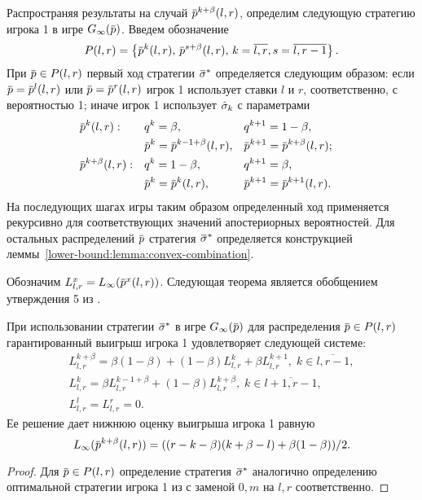{Распространяя результаты \cite{pyanykh16:discr:ru} на случай $\p^{k+\beta}(l, r)$,
определим следующую стратегию игрока 1 в игре $\theGame[\infty](\p)$. Введем
обозначение %
\begin{equation*}
  P(l,r) = \left\{
    \p^k(l, r), \, \p^{s+\beta}(l, r), \, k = \overline{l,r}, s = \overline{l,r-1}
  \right\}.
\end{equation*}
При $\p \in P(l,r)$ первый ход стратегии $\sigmav^*$ определяется следующим
образом: если $\p = \p^l(l,r)$ или $\p = \p^r(l,r)$ игрок 1 использует ставки
$l$ и $r$, соответственно, с вероятностью 1; иначе игрок 1 использует
$\hat{\sigma}_k$ с параметрами
\begin{align*}
  &\p^k(l, r):&
  &q^k = \beta,&
  &q^{k+1} = 1-\beta,\\
  && 
  &\p^k = \p^{k-1+\beta}(l, r),&
  &\p^{k+1} = \p^{k+\beta}(l, r);\\
  &\p^{k+\beta}(l, r):&
  &q^k = 1-\beta,&
  &q^{k+1} = \beta,\\
  &&
  &\p^k = \p^k(l, r),&
  &\p^{k+1} = \p^{k+1}(l, r).&
\end{align*}
На последующих шагах игры таким образом определенный ход применяется рекурсивно
для соответствующих значений апостериорных вероятностей. Для остальных
распределений $\p$ стратегия $\sigmav^*$ определяется конструкцией
леммы~\ref{lower-bound:lemma:convex-combination}.

Обозначим $L^x_{l,r} = \Low(\p^x(l,r))$. Следующая теорема является обобщением
утверждения 5 из \cite{pyanykh16:discr:ru}.
\begin{theorem}
  \label{lower-bound:theorem}
  При использовании стратегии $\sigmav^*$ в игре $\theGame[\infty](\p)$ для
  распределения %
  $\p \in P(l,r)$ %
  гарантированный выигрыш игрока 1 удовлетворяет следующей системе:
  \begin{equation}
    \label{lower-bound:eq:Linf-recurrence}
    \begin{gathered}
      L^{k+\beta}_{l,r} =
      \beta(1-\beta) + (1-\beta) L^k_{l,r} + \beta L^{k+1}_{l,r}, \;
      k \in \overline{l, r - 1}, \\
      L^k_{l,r} =
      \beta L^{k-1+\beta}_{l,r} + (1-\beta) L^{k+\beta}_{l,r}, \;
      k \in \overline{l + 1, r - 1},\\
      L^l_{l,r} = L^r_{l,r} = 0.
    \end{gathered}
  \end{equation}
  Ее решение дает нижнюю оценку выигрыша игрока 1 равную
  \begin{equation*}
    \label{lower-bound:eq:Linf-recurrence-solution}
    \Low(\p^{k+\beta}(l, r)) = ((r-k-\beta)(k+\beta-l) + \beta(1-\beta))/2.
  \end{equation*}
\end{theorem}
\begin{proof}
  Для $\p \in P(l,r)$ определение стратегия $\sigmav^*$ аналогично определению
  оптимальной стратегии игрока 1 из \cite{pyanykh16:discr:ru} с заменой $0, m$ на $l,
  r$ соответственно.


\end{proof}}
